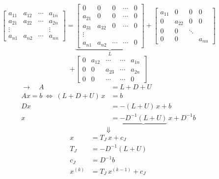 \documentclass[11pt,a4paper]{article}
\begin{document}
\[
  \begin{bmatrix}a_{11}&a_{12}&\cdots&a_{1n}\\a_{21}&a_{22}&\cdots&a_{2n}\\ \vdots&&&\vdots\\a_{n1}&a_{n2}&\cdots&a_{nn}\end{bmatrix}
  =\underbrace{\begin{bmatrix}0&0&0&\cdots&0\\a_{21}&0&0&\cdots&0\\a_{31}&a_{32}&0&\cdots&0\\ \vdots&&&&\\a_{n1}&a_{n2}&\cdots&\cdots&0\end{bmatrix}}_{L}
  +\begin{bmatrix}a_{11}&0&0&0\\0&a_{22}&0&0\\0&0&\ddots&\\0&0&&a_{nn}\end{bmatrix}
\]
\[
  +\begin{bmatrix}0&a_{12}&\cdots&\cdots&a_{1n}\\0&0&a_{23}&\cdots&a_{2n}\\0&0&\cdots&\cdots&0\end{bmatrix}
\]
\begin{align*}
  \longrightarrow\quad A&=L+D+U\\
  Ax=b\ \Leftrightarrow\ (L+D+U)\,x&=b\\
  Dx&=-(L+U)\,x+b\\
  x&=\underbrace{-D^{-1}(L+U)}\,x+D^{-1}b
\end{align*}
\[ \Downarrow \]
\begin{align*}
  x&=T_J\,x+c_J\\
  T_J&=-D^{-1}(L+U)\\
  c_J&=D^{-1}b\\
  x^{(k)}&=T_J\,x^{(k-1)}+c_J
\end{align*}
\end{document}
